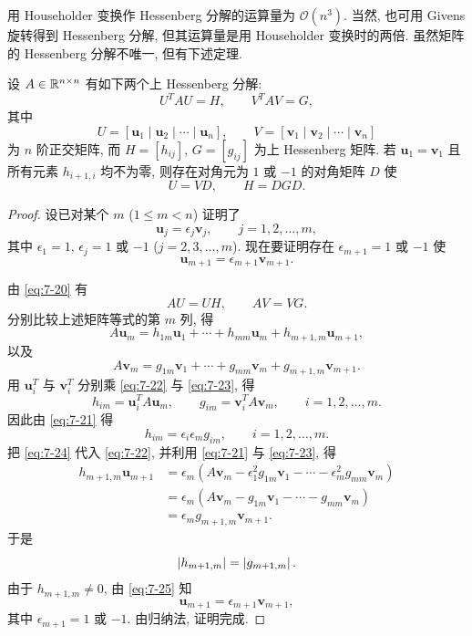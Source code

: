 用 Householder 变换作 Hessenberg 分解的运算量为 $\mathcal{O}(n^3)$. 当然, 也可用 Givens 旋转得到 Hessenberg 分解, 但其运算量是用 Householder 变换时的两倍. 虽然矩阵的 Hessenberg 分解不唯一, 但有下述定理.

\begin{theorem}
\label{thm:7-5}
设 $A\in\mathbb{R}^{n\times n}$ 有如下两个上 Hessenberg 分解:
\begin{equation}
  U^TAU=H,\qquad V^TAV=G,
  \label{eq:7-20}
\end{equation}
其中
\[
  U=[\mathbf{u}_1\mid\mathbf{u}_2\mid\cdots\mid\mathbf{u}_n],
  \qquad
  V=[\mathbf{v}_1\mid\mathbf{v}_2\mid\cdots\mid\mathbf{v}_n]
\]
为 $n$ 阶正交矩阵, 而 $H=[h_{ij}]$, $G=[g_{ij}]$ 为上 Hessenberg 矩阵. 若 $\mathbf{u}_1=\mathbf{v}_1$ 且所有元素 $h_{i+1,i}$ 均不为零, 则存在对角元为 $1$ 或 $-1$ 的对角矩阵 $D$ 使
\[
  U=VD,\qquad H=DGD.
\]
\end{theorem}

\begin{proof}
设已对某个 $m$ ($1\leqslant m<n$) 证明了
\begin{equation}
  \mathbf{u}_j=\epsilon_j\mathbf{v}_j,\qquad j=1,2,\ldots,m,
  \label{eq:7-21}
\end{equation}
其中 $\epsilon_1=1$, $\epsilon_j=1$ 或 $-1$ ($j=2,3,\ldots,m$). 现在要证明存在 $\epsilon_{m+1}=1$ 或 $-1$ 使
\[
  \mathbf{u}_{m+1}=\epsilon_{m+1}\mathbf{v}_{m+1}.
\]

由 \eqref{eq:7-20} 有
\[
  AU=UH,\qquad AV=VG.
\]
分别比较上述矩阵等式的第 $m$ 列, 得
\begin{equation}
  A\mathbf{u}_m=h_{1m}\mathbf{u}_1+\cdots+h_{mm}\mathbf{u}_m+h_{m+1,m}\mathbf{u}_{m+1},
  \label{eq:7-22}
\end{equation}
以及
\begin{equation}
  A\mathbf{v}_m=g_{1m}\mathbf{v}_1+\cdots+g_{mm}\mathbf{v}_m+g_{m+1,m}\mathbf{v}_{m+1}.
  \label{eq:7-23}
\end{equation}
用 $\mathbf{u}_i^T$ 与 $\mathbf{v}_i^T$ 分别乘 \eqref{eq:7-22} 与 \eqref{eq:7-23}, 得
\[
  h_{im}=\mathbf{u}_i^TA\mathbf{u}_m,\qquad
  g_{im}=\mathbf{v}_i^TA\mathbf{v}_m,\qquad
  i=1,2,\ldots,m.
\]
因此由 \eqref{eq:7-21} 得
\begin{equation}
  h_{im}=\epsilon_i\epsilon_mg_{im},\qquad i=1,2,\ldots,m.
  \label{eq:7-24}
\end{equation}
把 \eqref{eq:7-24} 代入 \eqref{eq:7-22}, 并利用 \eqref{eq:7-21} 与 \eqref{eq:7-23}, 得
\begin{equation}
  \begin{aligned}
    h_{m+1,m}\mathbf{u}_{m+1}
    &=\epsilon_m(A\mathbf{v}_m-\epsilon_1^2g_{1m}\mathbf{v}_1-\cdots-\epsilon_m^2g_{mm}\mathbf{v}_m)\\
    &=\epsilon_m(A\mathbf{v}_m-g_{1m}\mathbf{v}_1-\cdots-g_{mm}\mathbf{v}_m)\\
    &=\epsilon_mg_{m+1,m}\mathbf{v}_{m+1}.
  \end{aligned}
  \label{eq:7-25}
\end{equation}
于是
\[
  \left|h_{m+1,m}\right|=\left|g_{m+1,m}\right|.
\]
由于 $h_{m+1,m}\neq0$, 由 \eqref{eq:7-25} 知
\[
  \mathbf{u}_{m+1}=\epsilon_{m+1}\mathbf{v}_{m+1},
\]
其中 $\epsilon_{m+1}=1$ 或 $-1$. 由归纳法, 证明完成.
\end{proof}


